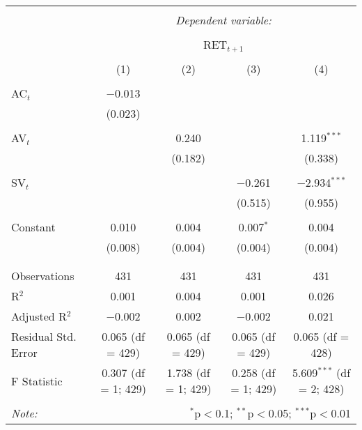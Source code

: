 
\begin{table}[!htbp] \centering 
  \caption{} 
  \label{} 
\begin{tabular}{@{\extracolsep{5pt}}lcccc} 
\\[-1.8ex]\hline 
\hline \\[-1.8ex] 
 & \multicolumn{4}{c}{\textit{Dependent variable:}} \\ 
\cline{2-5} 
\\[-1.8ex] & \multicolumn{4}{c}{RET$_{t+1}$} \\ 
\\[-1.8ex] & (1) & (2) & (3) & (4)\\ 
\hline \\[-1.8ex] 
 AC$_{t}$ & $-$0.013 &  &  &  \\ 
  & (0.023) &  &  &  \\ 
  & & & & \\ 
 AV$_{t}$ &  & 0.240 &  & 1.119$^{***}$ \\ 
  &  & (0.182) &  & (0.338) \\ 
  & & & & \\ 
 SV$_{t}$ &  &  & $-$0.261 & $-$2.934$^{***}$ \\ 
  &  &  & (0.515) & (0.955) \\ 
  & & & & \\ 
 Constant & 0.010 & 0.004 & 0.007$^{*}$ & 0.004 \\ 
  & (0.008) & (0.004) & (0.004) & (0.004) \\ 
  & & & & \\ 
\hline \\[-1.8ex] 
Observations & 431 & 431 & 431 & 431 \\ 
R$^{2}$ & 0.001 & 0.004 & 0.001 & 0.026 \\ 
Adjusted R$^{2}$ & $-$0.002 & 0.002 & $-$0.002 & 0.021 \\ 
Residual Std. Error & 0.065 (df = 429) & 0.065 (df = 429) & 0.065 (df = 429) & 0.065 (df = 428) \\ 
F Statistic & 0.307 (df = 1; 429) & 1.738 (df = 1; 429) & 0.258 (df = 1; 429) & 5.609$^{***}$ (df = 2; 428) \\ 
\hline 
\hline \\[-1.8ex] 
\textit{Note:}  & \multicolumn{4}{r}{$^{*}$p$<$0.1; $^{**}$p$<$0.05; $^{***}$p$<$0.01} \\ 
\end{tabular} 
\end{table} 
